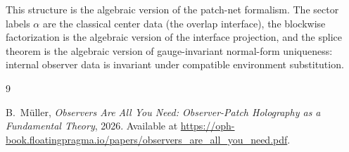 \documentclass[11pt]{article}
\begin{document}
This structure is the algebraic version of the patch-net formalism. The sector labels $\alpha$ are the classical center data (the overlap interface), the blockwise factorization is the algebraic version of the interface projection, and the splice theorem is the algebraic version of gauge-invariant normal-form uniqueness: internal observer data is invariant under compatible environment substitution.


\begin{thebibliography}{9}

B.~M\"uller,
\emph{Observers Are All You Need: Observer-Patch Holography as a Fundamental Theory},
2026.
Available at \url{https://oph-book.floatingpragma.io/papers/observers_are_all_you_need.pdf}.

\end{thebibliography}
\end{document}
